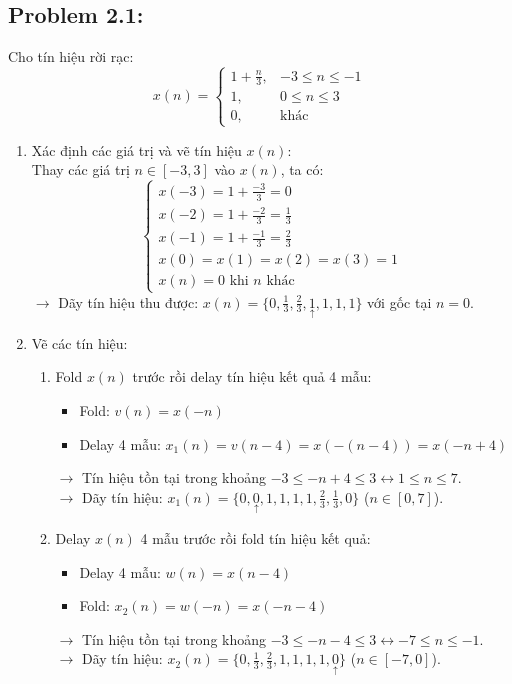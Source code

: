\subsection{Problem 2.1:}
Cho tín hiệu rời rạc:
\[
x(n) = \begin{cases}
1 + \frac{n}{3}, & -3 \le n \le -1 \\
1, & 0 \le n \le 3 \\
0, & \text{khác}
\end{cases}
\]

\begin{enumerate}
    \item Xác định các giá trị và vẽ tín hiệu $x(n)$:\\
    Thay các giá trị $n \in [-3, 3]$ vào $x(n)$, ta có:
    \[
    \begin{cases}
        x(-3) = 1 + \frac{-3}{3} = 0 \\
        x(-2) = 1 + \frac{-2}{3} = \frac{1}{3} \\
        x(-1) = 1 + \frac{-1}{3} = \frac{2}{3} \\
        x(0) = x(1) = x(2) = x(3) = 1 \\
        x(n) = 0 \text{ khi } n \text{ khác}
    \end{cases}
    \]
    $\rightarrow$ Dãy tín hiệu thu được: $x(n) = \{0, \frac{1}{3}, \frac{2}{3}, \underset{\uparrow}{1}, 1, 1, 1\}$ với gốc tại $n = 0$.

    \item Vẽ các tín hiệu:
    \begin{enumerate}
        \item Fold $x(n)$ trước rồi delay tín hiệu kết quả 4 mẫu:
        \begin{itemize}
            \item Fold: $v(n) = x(-n)$
            \item Delay 4 mẫu: $x_1(n) = v(n - 4) = x(-(n - 4)) = x(-n + 4)$
        \end{itemize}
        $\rightarrow$ Tín hiệu tồn tại trong khoảng $-3 \le -n + 4 \le 3 \leftrightarrow 1 \le n \le 7$.\\
        $\rightarrow$ Dãy tín hiệu: $x_1(n) = \{0, \underset{\uparrow}{0}, 1, 1, 1, 1, \frac{2}{3}, \frac{1}{3}, 0\}$ ($n \in [0, 7]$).

        \item Delay $x(n)$ 4 mẫu trước rồi fold tín hiệu kết quả:
        \begin{itemize}
            \item Delay 4 mẫu: $w(n) = x(n - 4)$
            \item Fold: $x_2(n) = w(-n) = x(-n - 4)$
        \end{itemize}
        $\rightarrow$ Tín hiệu tồn tại trong khoảng $-3 \le -n - 4 \le 3 \leftrightarrow -7 \le n \le -1$.\\
        $\rightarrow$ Dãy tín hiệu: $x_2(n) = \{0, \frac{1}{3}, \frac{2}{3}, 1, 1, 1, 1, \underset{\uparrow}{0}\}$ ($n \in [-7, 0]$).
    \end{enumerate}


\end{enumerate}
